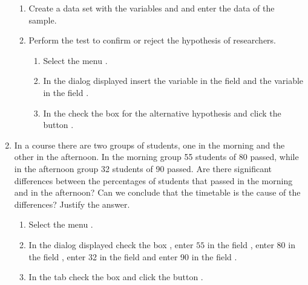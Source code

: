 \begin{enumerate}[leftmargin=*]
\begin{enumerate}
\item Create a data set with the variables  and  and enter the data of the sample.

\item Perform the test to confirm or reject the hypothesis of researchers.
\begin{indication}
\begin{enumerate}
\item Select the menu .
\item In the dialog displayed insert the variable  in the field  and
the variable  in the field .
\item In the  check the box  for the alternative hypothesis and click the button
.
\end{enumerate}
\end{indication}
\end{enumerate}


\item In a course there are two groups of students, one in the morning and the other in the afternoon.
In the morning group 55 students of 80 passed, while in the afternoon group 32 students of 90 passed.
Are there significant differences between the percentages of students that passed in the morning and in the afternoon?
Can we conclude that the timetable is the cause of the differences?
Justify the answer. 
\begin{indication}
\begin{enumerate}
\item Select the menu .
\item In the dialog displayed check the box , enter $55$ in the field , enter 80 in the field , enter 32 in the field  and enter 90
in the field .
\item In the  tab check the box  and click the button .
\end{enumerate}
\end{indication}
\end{enumerate}


